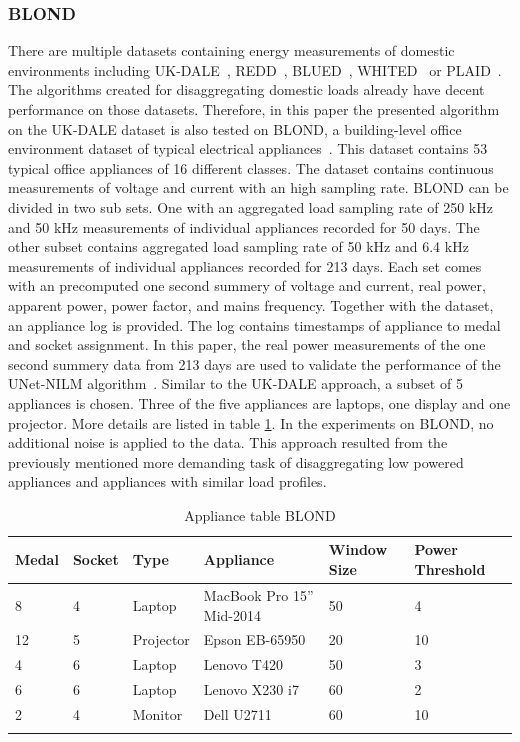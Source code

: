 \documentclass[sigconf]{acmart}
\begin{document}
\subsubsection{BLOND}
\label{seciton:datasets:blond}
There are multiple datasets containing energy measurements of domestic environments including UK-DALE~\cite{UK-DALE}, REDD~\cite{Kolter2011REDDA}, BLUED~\cite{BLUEDee}, WHITED~\cite{Kahl2016WHITEDAWH} or PLAID~\cite{Gao2014PLAIDAP}.
The algorithms created for disaggregating domestic loads already have decent performance on those datasets. 
Therefore, in this paper the presented algorithm on the UK-DALE dataset is also tested on BLOND, a building-level office environment dataset of typical electrical appliances~\cite{BLOND}.
This dataset contains 53 typical office appliances of 16 different classes. 
The dataset contains continuous measurements of voltage and current with an high sampling rate.
BLOND can be divided in two sub sets. 
One with an aggregated load sampling rate of 250 kHz and 50 kHz measurements of individual appliances recorded for 50 days.
The other subset contains aggregated load sampling rate of 50 kHz and 6.4 kHz measurements of individual appliances recorded for 213 days.
Each set comes with an precomputed one second summery of voltage and current, real power, apparent power, power factor, and mains frequency. 
Together with the dataset, an appliance log is provided.
The log contains timestamps of appliance to medal and socket assignment.
In this paper, the real power measurements of the one second summery data from 213 days are used to validate the performance of the UNet-NILM algorithm~\cite{unetnilm}.
Similar to the UK-DALE approach, a subset of 5 appliances is chosen.
Three of the five appliances are laptops, one display and one projector. 
More details are listed in table \ref{table:appliance_list_blond}.
In the experiments on BLOND, no additional noise is applied to the data.
This approach resulted from the previously mentioned more demanding task of disaggregating low powered appliances and appliances with similar load profiles.

\begin{table}
  \caption{Appliance table BLOND}
    \begin{tabular}{l l l l l l}
      \hline\hline
      Medal & Socket & Type & Appliance & Window Size & Power Threshold\\
      \hline
      8 & 4 & Laptop & MacBook Pro 15'' Mid-2014 & 50 & 4\\
      12 & 5 & Projector & Epson EB-65950 & 20 & 10\\
      4 & 6 & Laptop & Lenovo T420 & 50 & 3\\
      6 & 6 & Laptop & Lenovo X230 i7 & 60 & 2\\
      2 & 4 & Monitor & Dell U2711 & 60 & 10\\
      \hline
      \label{table:appliance_list_blond} 
    \end{tabular}
\end{table}
\end{document}
